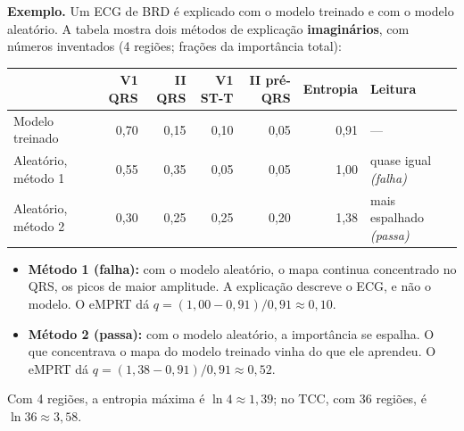 \documentclass[11pt,a4paper]{article}
\begin{document}
\textbf{Exemplo.} Um ECG de BRD é explicado com o modelo treinado e com o modelo aleatório. A tabela mostra dois métodos de explicação \textbf{imaginários}, com números inventados (4 regiões; frações da importância total):
\begin{center}\small
\setlength{\tabcolsep}{4pt}
\begin{tabular}{lrrrrrl}
\toprule
& \textbf{V1 QRS} & \textbf{II QRS} & \textbf{V1 ST-T} & \textbf{II pré-QRS} & \textbf{Entropia} & \textbf{Leitura} \\
\midrule
Modelo treinado & 0,70 & 0,15 & 0,10 & 0,05 & 0,91 & --- \\
Aleatório, método 1 & 0,55 & 0,35 & 0,05 & 0,05 & 1,00 & quase igual \textit{(falha)} \\
Aleatório, método 2 & 0,30 & 0,25 & 0,25 & 0,20 & 1,38 & mais espalhado \textit{(passa)} \\
\bottomrule
\end{tabular}
\end{center}
\begin{itemize}
\item \textbf{Método 1 (falha):} com o modelo aleatório, o mapa continua concentrado no QRS, os picos de maior amplitude. A explicação descreve o ECG, e não o modelo. O eMPRT dá $q = (1{,}00 - 0{,}91)/0{,}91 \approx 0{,}10$.
\item \textbf{Método 2 (passa):} com o modelo aleatório, a importância se espalha. O que concentrava o mapa do modelo treinado vinha do que ele aprendeu. O eMPRT dá $q = (1{,}38 - 0{,}91)/0{,}91 \approx 0{,}52$.
\end{itemize}
Com 4 regiões, a entropia máxima é $\ln 4 \approx 1{,}39$; no TCC, com 36 regiões, é $\ln 36 \approx 3{,}58$.
\end{document}
